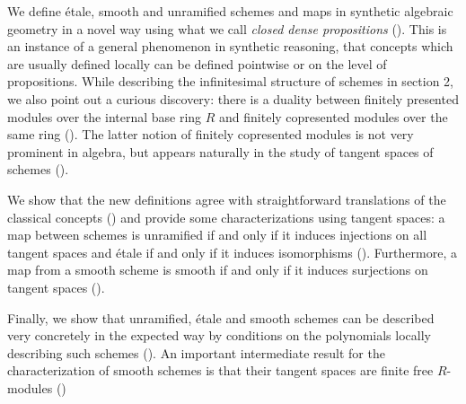 We define étale, smooth and unramified schemes and maps in synthetic algebraic geometry in a novel way using what we call \emph{closed dense propositions} ().
This is an instance of a general phenomenon in synthetic reasoning, that concepts which are usually defined locally can be defined pointwise or on the level of propositions.
While describing the infinitesimal structure of schemes in section 2, we also point out a curious discovery: there is a duality between finitely presented modules over the internal base ring $R$ and finitely copresented modules over the same ring ().
The latter notion of finitely copresented modules is not very prominent in algebra, but appears naturally in the study of tangent spaces of schemes ().

We show that the new definitions agree with straightforward translations of the classical concepts () and provide some characterizations using tangent spaces:
a map between schemes is unramified if and only if it induces injections on all tangent spaces and étale if and only if it induces isomorphisms (). Furthermore, a map from a smooth scheme is smooth if and only if it induces surjections on tangent spaces ().

Finally, we show that unramified, étale and smooth schemes can be described very concretely in the expected way by conditions on the polynomials locally describing such schemes (). An important intermediate result for the characterization of smooth schemes is that their tangent spaces are finite free $R$-modules ()
